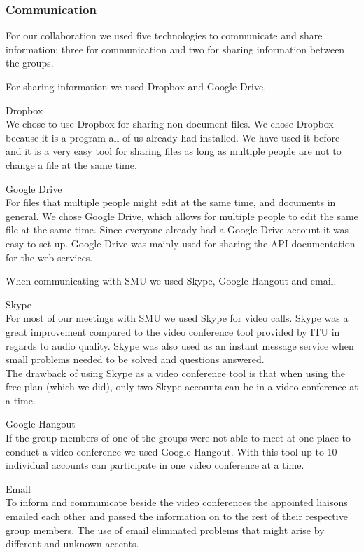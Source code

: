 \subsubsection{Communication}
For our collaboration we used five technologies to communicate and share information; three for communication and two for sharing information between the groups.

For sharing information we used Dropbox and Google Drive. \vspace{-4mm}
\begin{description}
	\item Dropbox \\
		We chose to use Dropbox for sharing non-document files. We chose Dropbox because it is a program all of us already had installed. We have used it before and it is a very easy tool for sharing files as long as multiple people are not to change a file at the same time.
	\item Google Drive \\
		For files that multiple people might edit at the same time, and documents in general. We chose Google Drive, which allows for multiple people to edit the same file at the same time. Since everyone already had a Google Drive account it was easy to set up.
		Google Drive was mainly used for sharing the API documentation for the web services.
\end{description}

When communicating with SMU we used Skype, Google Hangout and email.
\vspace{-4mm}
\begin{description}
	\item Skype \\
		For most of our meetings with SMU we used Skype for video calls. Skype was a great improvement compared to the video conference tool provided by ITU in regards to audio quality.
		Skype was also used as an instant message service when small problems needed to be solved and questions answered. \\
		The drawback of using Skype as a video conference tool is that when using the free plan (which we did), only two Skype accounts can be in a video conference at a time.
	\item Google Hangout \\
		If the group members of one of the groups were not able to meet at one place to conduct a video conference we used Google Hangout. With this tool up to 10 individual accounts can participate in one video conference at a time.
	\item Email \\
		To inform and communicate beside the video conferences the appointed liaisons emailed each other and passed the information on to the rest of their respective group members.
		The use of email eliminated problems that might arise by different and unknown accents.
\end{description}